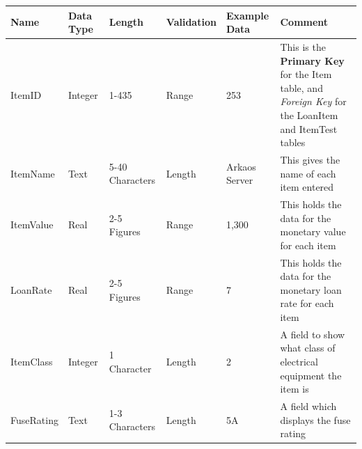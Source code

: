 \begin{landscape}
    \begin{center}
        \begin{tabular}{|p{3cm}|p{2cm}|p{3cm}|p{2cm}|p{2cm}|p{5cm}|}
            \hline
            \textbf{Name} & \textbf{Data Type} & \textbf{Length} & \textbf{Validation} & \textbf{Example Data} & \textbf{Comment} \\ \hline
            ItemID           & Integer & 1-435           & Range        & 253           & This is the \textbf{Primary Key} for the Item table, and \emph{Foreign Key} 
                                                                                          for the LoanItem and ItemTest tables \\ \hline
            ItemName         & Text    & 5-40 Characters & Length       & Arkaos Server & This gives the name of each item entered \\ \hline
            ItemValue        & Real    & 2-5 Figures     & Range        & 1,300         & This holds the data for the monetary value for each item \\ \hline
            LoanRate         & Real    & 2-5 Figures     & Range        & 7             & This holds the data for the monetary loan rate for each item \\ \hline
            ItemClass        & Integer & 1 Character     & Length       & 2             & A field to show what class of electrical equipment the item is \\ \hline
            FuseRating       & Text    & 1-3 Characters  & Length       & 5A            & A field which displays the fuse rating \\ \hline
            \end{tabular}
    \end{center}
\end{landscape}


